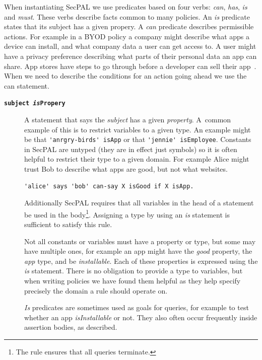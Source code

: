 \documentclass[thesis.tex]{subfiles}
\begin{document}
When instantiating SecPAL we use predicates based on four verbs: \emph{can}, \emph{has}, \emph{is} and \emph{must}.
These verbs describe facts common to many policies.
An \emph{is} predicate states that its subject has a given propery.
A \emph{can} predicate describes permissible actions.
For example in a \ac{BYOD} policy a company might describe what apps a device can install, and what company data a user can get access to.
A user might have a privacy preference describing what parts of their personal data an app can share.
App stores have steps to go through before a developer can sell their app~\cite{oberheide_dissecting_2012,google_google_2017}.
When we need to describe the conditions for an action going ahead we use the can statement.

\begin{description}
\item[\bfseries\texttt{subject \emph{is}Propery}]
  A statement that says the \emph{subject} has a given \emph{property}.
  A~common example of this is to restrict variables to a given type.
  An example might be that \lstinline!'anrgry-birds' isApp! or that \lstinline!'jennie' isEmployee!.
  Constants in SecPAL are untyped (they are in effect just symbols) so it is
  often helpful to restrict their type to a given domain.  For example Alice
  might trust Bob to describe what apps are good, but not what websites.
  \begin{lstlisting}
'alice' says 'bob' can-say X isGood if X isApp.
  \end{lstlisting}
  Additionally SecPAL requires that all variables in the head of a statement be
  used in the body\footnote{The rule ensures that all queries terminate.}.
  Assigning a type by using an \emph{is} statement is sufficient to satisfy this rule.

  Not all constants or variables must have a property or type, but some may have multiple
  ones, for example an app might have the \emph{good} property, the \emph{app}
  type, and be \emph{installable}.  Each of these properties is expressed using
  the \emph{is} statement.  There is no obligation to provide a type to
  variables, but when writing policies we have found them helpful as they help
  specify precisely the domain a rule should operate on.

  \emph{Is} predicates are sometimes used as goals for queries, for example to test whether
  an app \emph{isInstallable} or not.  They also often occur frequently inside
  assertion bodies, as described.


\end{description}
\end{document}
